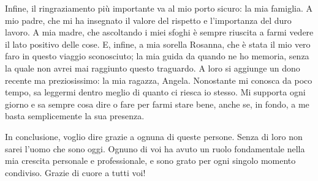 \newpage

Infine, il ringraziamento più importante va al mio porto sicuro: la mia famiglia. A mio padre, che mi ha insegnato il valore del rispetto e l’importanza del duro lavoro. A mia madre, che ascoltando i miei sfoghi è sempre riuscita a farmi vedere il lato positivo delle cose. E, infine, a mia sorella Rosanna, che è stata il mio vero faro in questo viaggio sconosciuto; la mia guida da quando ne ho memoria, senza la quale non avrei mai raggiunto questo traguardo. A loro si aggiunge un dono recente ma preziosissimo: la mia ragazza, Angela. Nonostante mi conosca da poco tempo, sa leggermi dentro meglio di quanto ci riesca io stesso. Mi supporta ogni giorno e sa sempre cosa dire o fare per farmi stare bene, anche se, in fondo, a me basta semplicemente la sua presenza.

In conclusione, voglio dire grazie a ognuna di queste persone. Senza di loro non sarei l’uomo che sono oggi. Ognuno di voi ha avuto un ruolo fondamentale nella mia crescita personale e professionale, e sono grato per ogni singolo momento condiviso. Grazie di cuore a tutti voi!